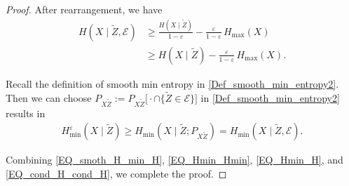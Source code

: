 \documentclass[onecolumn]{IEEEtran} %
\newcommand{\1}{\mathbbm{1}}
\theoremstyle{boldremark}
\begin{document}
\begin{proof}
After rearrangement, we have
\begin{align}
H(X\mid  \tilde{Z},\mathcal E)
  &\ge \frac{H(X\mid  \tilde{Z})}{1-\varepsilon}-\frac{\varepsilon}{1-\varepsilon}\,H_{\max}(X)\\
  &\ge H(X\mid  \tilde{Z})-\frac{\varepsilon}{1-\varepsilon}\,H_{\max}(X).\label{EQ_cond_H_cond_H}
\end{align}

Recall the definition of smooth min entropy in \eqref{Def_smooth_min_entropy2}. Then we can choose
\(  P_{X \tilde{Z}}:=P_{X \tilde{Z}}\bigl[\cdot\cap\{ \tilde{Z}\in\mathcal E\}\bigr]\)
in \eqref{Def_smooth_min_entropy2} results in 
\begin{align}
   H_{\min}^{\varepsilon}(X\mid  \tilde{Z})
   \ge H_{\min}(X\mid  \tilde{Z};  P_{X \tilde{Z}})
   = H_{\min}(X\mid  \tilde{Z},\mathcal E).                          \label{EQ_smoth_H_min_H}
\end{align}

Combining \eqref{EQ_smoth_H_min_H}, \eqref{EQ_Hmin_Hmin},  \eqref{EQ_Hmin_H},  and \eqref{EQ_cond_H_cond_H}, we complete the proof.
\end{proof}
\end{document}
